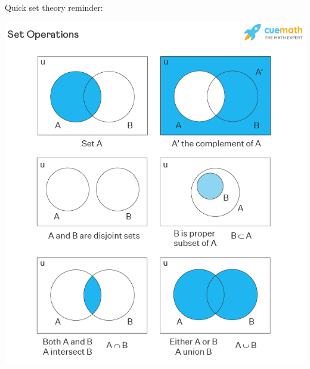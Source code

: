 \documentclass{beamer}
\begin{document}
\begin{frame}{}\begin{minipage}{.35\linewidth}
     Quick set theory reminder:
\end{minipage}%
\begin{minipage}{.65\linewidth}
    \vspace{-1.2cm}
  \includegraphics[height=\paperheight]{figures/SetOperationsold.png}
\end{minipage}
\end{frame}
\end{document}
